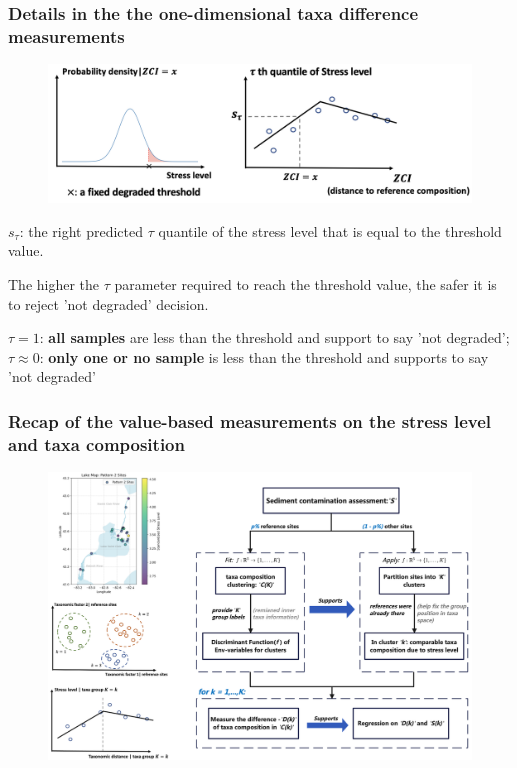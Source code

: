 \documentclass{beamer}
\begin{document}
\begin{frame}
\frametitle{Details in the the one-dimensional taxa difference measurements}

\begin{figure}
\centering
\includegraphics[width=.9\textwidth]{figures/p16_degraded_threshold_and_quantile_regression.png}
\end{figure}

$s_{\tau}$: the right predicted $\tau$ quantile of the stress level that is equal to the threshold value.

The higher the $\tau$ parameter required to reach the threshold value, the safer it is to reject 'not degraded' decision.

$\tau = 1$: \textbf{all samples} are less than the threshold and support to say 'not degraded';
$\tau \approx 0$: \textbf{only one or no sample} is less than the threshold and supports to say 'not degraded'

\end{frame}

\begin{frame}
\frametitle{Recap of the value-based measurements on the stress level and taxa composition}

\begin{figure}
\centering
\includegraphics[width=\textwidth]{figures/workflow_of_general_workframe_part1.png}
\end{figure}

\end{frame}
\end{document}
